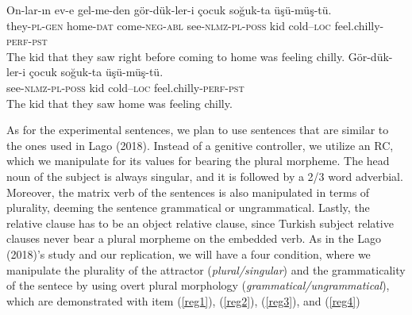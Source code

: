 \documentclass[doc]{apa6}
\begin{document}
\begin{exe}
\ex
  \begin{xlist}
    \ex \label{rcexample}
    \gll On-lar-{\i}n ev-e gel-me-den g\"{o}r-d\"{u}k-ler-i \c{c}ocuk so\u{g}uk-ta \"{u}\c{s}\"{u}-m\"{u}\c{s}-t\"{u}.\\
    they-\textsc{pl}-\textsc{gen} home-\textsc{dat} come-\textsc{neg}-\textsc{abl} see-\textsc{nlmz}-\textsc{pl}-\textsc{poss} kid cold--\textsc{loc} feel.chilly-\textsc{perf}-\textsc{pst}\\
    \glt The kid that they saw right before coming to home was feeling chilly. 
    \ex \label{rcexample2}
    \gll G\"{o}r-d\"{u}k-ler-i \c{c}ocuk so\u{g}uk-ta \"{u}\c{s}\"{u}-m\"{u}\c{s}-t\"{u}.\\
    see-\textsc{nlmz}-\textsc{pl}-\textsc{poss} kid cold--\textsc{loc} feel.chilly-\textsc{perf}-\textsc{pst}\\
    \glt The kid that they saw home was feeling chilly.
  \end{xlist}
\end{exe}

As for the experimental sentences, we plan to use sentences that are
similar to the ones used in Lago (2018). Instead of a genitive
controller, we utilize an RC, which we manipulate for its values for
bearing the plural morpheme. The head noun of the subject is always
singular, and it is followed by a 2/3 word adverbial. Moreover, the
matrix verb of the sentences is also manipulated in terms of plurality,
deeming the sentence grammatical or ungrammatical. Lastly, the relative
clause has to be an object relative clause, since Turkish subject
relative clauses never bear a plural morpheme on the embedded verb. As
in the Lago (2018)'s study and our replication, we will have a four
condition, where we manipulate the plurality of the attractor
(\emph{plural/singular}) and the grammaticality of the sentece by using
overt plural morphology (\emph{grammatical/ungrammatical}), which are
demonstrated with item (\ref{reg1}), (\ref{reg2}), (\ref{reg3}), and
(\ref{reg4})
\end{document}
